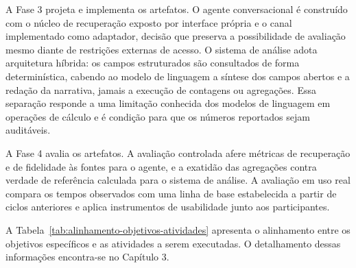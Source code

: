 A Fase 3 projeta e implementa os artefatos. O agente conversacional é construído
com o núcleo de recuperação exposto por interface própria e o canal implementado
como adaptador, decisão que preserva a possibilidade de avaliação mesmo diante
de restrições externas de acesso. O sistema de análise adota arquitetura
híbrida: os campos estruturados são consultados de forma determinística, cabendo
ao modelo de linguagem a síntese dos campos abertos e a redação da narrativa,
jamais a execução de contagens ou agregações. Essa separação responde a uma
limitação conhecida dos modelos de linguagem em operações de cálculo e é
condição para que os números reportados sejam auditáveis.

A Fase 4 avalia os artefatos. A avaliação controlada afere métricas de
recuperação e de fidelidade às fontes para o agente, e a exatidão das agregações
contra verdade de referência calculada para o sistema de análise. A avaliação
em uso real compara os tempos observados com uma linha de base estabelecida a
partir de ciclos anteriores e aplica instrumentos de usabilidade junto aos
participantes.

A Tabela~\ref{tab:alinhamento-objetivos-atividades} apresenta o alinhamento
entre os objetivos específicos e as atividades a serem executadas. O
detalhamento dessas informações encontra-se no Capítulo 3.

